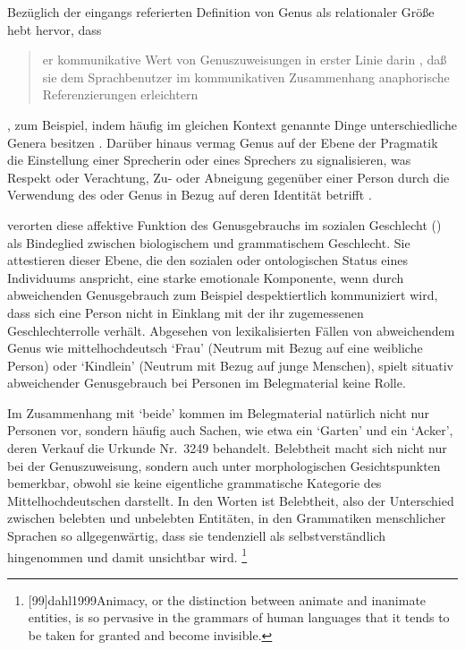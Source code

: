 Bezüglich der eingangs referierten Definition von Genus als relationaler Größe
hebt \citet[42]{koepcke1982} hervor, dass \blockquote{er
kommunikative Wert von Genuszuweisungen \textelp{} in erster Linie darin
, daß sie dem Sprachbenutzer im kommunikativen Zusammenhang
anaphorische Referenzierungen erleichtern}, zum Beispiel, indem häufig im
gleichen Kontext genannte Dinge unterschiedliche Genera besitzen \autocite[dazu
auch][320--323]{corbett1991}. Darüber hinaus vermag Genus auf der Ebene der
Pragmatik die Einstellung einer Sprecherin oder eines Sprechers zu
signalisieren, was Respekt oder Verachtung, Zu- oder Abneigung gegenüber einer
Person durch die Verwendung des  oder  Genus in
Bezug auf deren Identität betrifft \autocite[322--323]{corbett1991}.

\citet{steriopolosteriopolo2022} verorten diese affektive Funktion des
Genus\-gebrauchs im sozialen Geschlecht () als Bindeglied
zwischen biologischem und grammatischem Geschlecht. Sie attestieren dieser
Ebene, die den sozialen oder ontologischen Status eines Individuums anspricht,
eine starke emotionale Komponente, wenn durch abweichenden Genus\-gebrauch zum
Beispiel despektiertlich kommuniziert wird, dass sich eine Person nicht in
Einklang mit der ihr zugemessenen Geschlechterrolle verhält.
Abgesehen von lexikalisierten Fällen von abweichendem Genus wie
mittelhochdeutsch  `Frau' (Neutrum mit Bezug auf eine weibliche
Person) oder  `Kindlein' (Neutrum mit Bezug auf junge
Menschen), spielt situativ abweichender Genusgebrauch bei Personen im
Belegmaterial keine Rolle.

Im Zusammenhang mit  `beide' kommen im Belegmaterial natürlich
nicht nur Personen vor, sondern häufig auch Sachen, wie etwa ein 
`Garten' und ein  `Acker', deren Verkauf die Urkunde Nr.~3249
\autocites(Freiburg i.\,Br., 1299)[][]{cao4} behandelt. Belebtheit macht sich
nicht nur bei der Genuszuweisung, sondern auch unter morphologischen
Gesichtspunkten bemerkbar, obwohl sie keine eigentliche grammatische Kategorie
des Mittelhochdeutschen darstellt. In den Worten  ist
Belebtheit, also der Unterschied zwischen belebten und unbelebten Entitäten, in
den Grammatiken menschlicher Sprachen so allgegenwärtig, dass sie tendenziell
als selbstverständlich hingenommen und damit unsichtbar wird.%
%
	\footnote{[99]{dahl1999}{Animacy, or the
		distinction between animate and inanimate entities, is so pervasive in
		the grammars of human languages that it tends to be taken for granted
		and become invisible}.}

